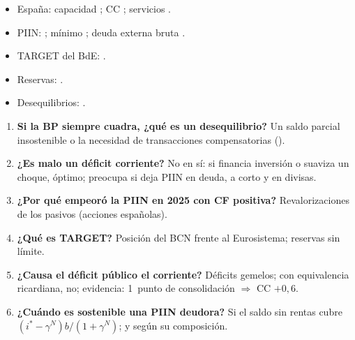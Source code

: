 \documentclass{article}
\begin{document}
\begin{columnas}
\anexorepaso
{}
\begin{itemize}
\item España: capacidad ; CC ; servicios .
\item PIIN: ; mínimo ; deuda externa bruta .
\item TARGET del BdE: .
\item Reservas: .
\item Desequilibrios: .
\end{itemize}
\begin{enumerate}
\item \textbf{Si la BP siempre cuadra, ¿qué es un desequilibrio?} Un saldo parcial insostenible o la necesidad de transacciones compensatorias ().
\item \textbf{¿Es malo un déficit corriente?} No en sí: si financia inversión o suaviza un choque, óptimo; preocupa si deja PIIN en deuda, a corto y en divisas.
\item \textbf{¿Por qué empeoró la PIIN en 2025 con CF positiva?} Revalorizaciones de los pasivos (acciones españolas).
\item \textbf{¿Qué es TARGET?} Posición del BCN frente al Eurosistema; reservas sin límite.
\item \textbf{¿Causa el déficit público el corriente?} Déficits gemelos; con equivalencia ricardiana, no; evidencia: 1~punto de consolidación $\Rightarrow$ CC $+0{,}6$.
\item \textbf{¿Cuándo es sostenible una PIIN deudora?} Si el saldo sin rentas cubre $(i^*-\gamma^N)b/(1+\gamma^N)$; y según su composición.
\end{enumerate}
\begin{trampa}
\begin{itemize}

\end{itemize}
\end{trampa}
\end{columnas}
\end{document}
